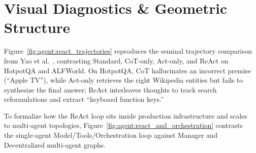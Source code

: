 \documentclass[../../../../master.tex]{subfiles}
\begin{document}
\section{Visual Diagnostics \& Geometric Structure}
\label{sec:agent:visuals}

Figure~\ref{fig:agent:react_trajectories} reproduces the seminal trajectory comparison from Yao et al.~, contrasting Standard, CoT-only, Act-only, and ReAct on HotpotQA and ALFWorld. On HotpotQA, CoT hallucinates an incorrect premise (``Apple TV''), while Act-only retrieves the right Wikipedia entities but fails to synthesize the final answer; ReAct interleaves thoughts to track search reformulations and extract ``keyboard function keys.''


To formalize how the ReAct loop sits inside production infrastructure and scales to multi-agent topologies, Figure~\ref{fig:agent:react_and_orchestration} contrasts the single-agent Model/Tools/Orchestration loop against Manager and Decentralized multi-agent graphs.
\end{document}
